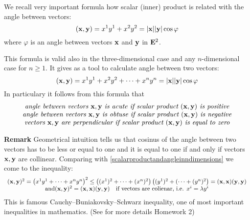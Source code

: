 \documentclass[12pt]{article}
\numberwithin{equation}{section}
\begin{document}
We recall very important formula how scalar (inner) product is
related with the angle between vectors:
 \begin{equation*}\label{scalarproductandangle}
  ({\bf x},{\bf y})=x^1y^1+x^2y^2=|{\bf x}||{\bf y}|\cos\varphi
\end{equation*}
where $\varphi$ is an angle between vectors ${\bf x}$ and ${\bf y}$ in ${\bf E}^2$.

This formula is valid also in the three-dimensional case and any $n$-dimensional case for $n\geq 1$.
It gives as a tool to calculate angle between two vectors:
\begin{equation}\label{scalarproductandangleinndimensions}
  ({\bf x},{\bf y})=x^1y^1+x^2y^2+\dots+x^ny^n=|{\bf x}||{\bf y}|\cos\varphi
\end{equation}
In particulary it follows from this formula
 that
                \begin{equation}\label{angleacuteorobtuse}
                \begin {array}{cc}
 \hbox {\it angle between vectors ${\bf x},{\bf y}$ is acute  if scalar product $({\bf x},{\bf y})$ is positive}\\
\hbox {\it angle between vectors ${\bf x},{\bf y}$ is obtuse  if scalar product $({\bf x},{\bf y})$ is negative}\\
\hbox {\it vectors ${\bf x},{\bf y}$ are perpendicular  if scalar product $({\bf x},{\bf y})$ is equal to zero}
          \end{array}
          \end{equation}



{\footnotesize {\bf Remark} Geometrical intuition  tells us that cosinus of the angle between two vectors has to be
 less or equal to one and it is equal to one if and only if vectors ${\bf x},{\bf y}$ are collinear.
 Comparing with \eqref{scalarproductandangleinndimensions} we come to the inequality:
                  \begin{equation}\label{cauchybuniakovsky}
                  \begin{array}{cc}
            ({\bf x},{\bf y})^2=\left(x^1y^1+\dots+x^ny^n\right)^2\leq \left((x^1)^2+\dots+(x^n)^2\right)
             \left((y^1)^2+(\dots+(y^n)^2\right)=({\bf x},{\bf x})({\bf y},{\bf y})\\
           {\rm and} ({\bf x},{\bf y})^2=({\bf x},{\bf x})({\bf y},{\bf y})\quad \hbox {if vectors are colienar, i.e. $x^i=\lambda y^i$}
             \end{array}
                  \end{equation}
This is famous Cauchy--Buniakovsky--Schwarz inequality, one of most
important inequalities in mathematics. (See for more details
Homework 2)}
\end{document}
